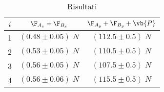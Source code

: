 \begin{table}[h!]
    
    \hspace{5mm} 
    \begin{tabular}{|c|c|c|}
        \hline
        $i$ & $\F_{A_x} + \F_{B_x}$& $\F_{A_y} + \F_{B_y} + \vb{P}$\\
        \hline
        1 & $(0.48 \pm 0.05)\; N$  & $(112.5\pm 0.5) \;N$\\
        2 & $(0.53 \pm 0.05)\; N$  & $(110.5\pm 0.5) \;N$\\
        3 & $(0.56 \pm 0.05)\; N$  & $(107.5\pm 0.5) \;N$\\
        4 & $(0.56 \pm 0.06)\; N$  & $(115.5\pm 0.5) \;N$\\
       


        \hline
    \end{tabular}
    \caption{Risultati}
    \label{tabellaRis}
\end{table}
